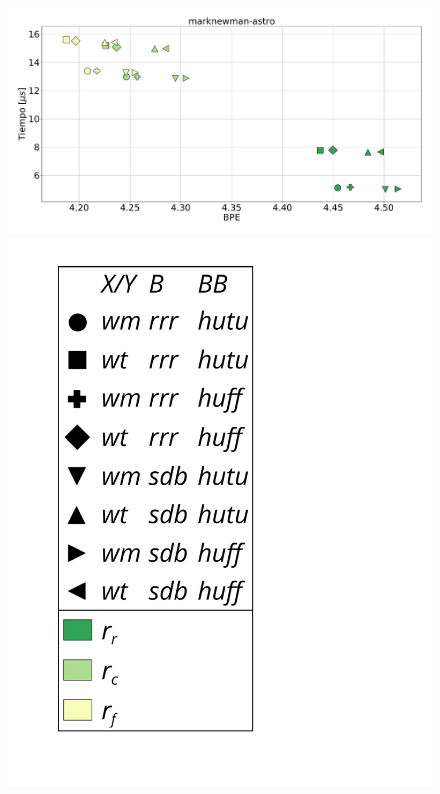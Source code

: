 \begin{figure}
    	\centering
    	\begin{minipage}{1\textwidth}
    			\centering
    			\begin{minipage}{0.8\textwidth}
    				\centering
    				\includegraphics[width=1\linewidth]{img/sdsl/aleatorioBig/marknewman-astro.pdf}
    			\end{minipage}
    			\begin{minipage}{0.15\textwidth}
    				\centering
    				\includegraphics[scale=.235, clip, trim=70 0 0 0]{img/sdsl/label.pdf}
    			\end{minipage}
    			

\end{minipage}
\end{figure}
